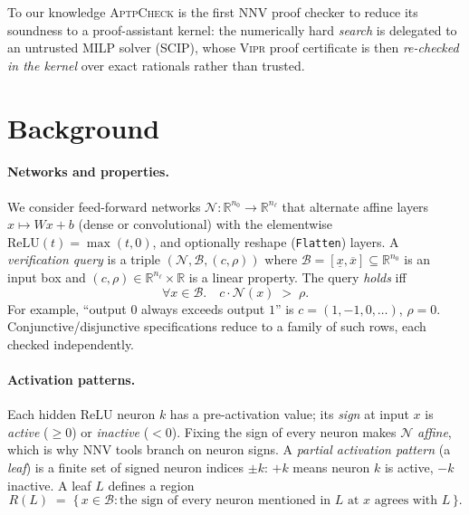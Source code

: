 \documentclass[runningheads]{llncs}
\newcommand{\R}{\mathbb{R}}
\newcommand{\net}{\mathcal{N}}
\newcommand{\reg}{R}
\newcommand{\dom}{\mathcal{B}}          %
\newcommand{\leaf}{L}
\newcommand{\vipr}{\textsc{Vipr}}
\newcommand{\scip}{\textsc{SCIP}}
\newcommand{\tool}{\textsc{AptpCheck}}
\newcommand{\relu}{\ensuremath{\mathrm{ReLU}}}
\newcommand{\code}[1]{\texttt{#1}}
\begin{document}
To our knowledge \tool{} is the first NNV proof checker to reduce its soundness to a
proof-assistant kernel: the numerically hard \emph{search} is delegated to an
untrusted MILP solver (\scip), whose \vipr{} proof certificate is then
\emph{re-checked in the kernel} over exact rationals rather than trusted.

\section{Background}\label{sec:background}

\paragraph{Networks and properties.}
We consider feed-forward networks $\net : \R^{n_0}\!\to\R^{n_\ell}$ that alternate
affine layers $x \mapsto Wx+b$ (dense or convolutional) with the elementwise
$\relu(t)=\max(t,0)$, and optionally reshape (\code{Flatten}) layers. A
\emph{verification query} is a triple $(\net, \dom, (c, \rho))$ where
$\dom=[\underline x,\overline x]\subseteq\R^{n_0}$ is an input box and
$(c,\rho)\in\R^{n_\ell}\times\R$ is a linear property. The query \emph{holds} iff
\begin{equation}\label{eq:property}
  \forall x\in\dom.\quad c\cdot \net(x) \;>\; \rho .
\end{equation}
For example, ``output $0$ always exceeds output $1$'' is $c=(1,-1,0,\dots)$,
$\rho=0$. Conjunctive/disjunctive specifications reduce to a family of such rows,
each checked independently.

\paragraph{Activation patterns.}
Each hidden \relu{} neuron $k$ has a pre-activation value; its \emph{sign} at input
$x$ is \emph{active} ($\ge 0$) or \emph{inactive} ($<0$). Fixing the sign of every
neuron makes $\net$ \emph{affine}, which is why NNV tools branch on neuron signs. A
\emph{partial activation pattern} (a \emph{leaf}) is a finite set of signed neuron
indices $\pm k$: $+k$ means neuron $k$ is active, $-k$ inactive. A leaf $\leaf$
defines a region
\begin{equation}\label{eq:region}
  \reg(\leaf) \;=\; \{\, x\in\dom : \text{the sign of every neuron mentioned in }\leaf\text{ at }x\text{ agrees with }\leaf \,\}.
\end{equation}
\end{document}
